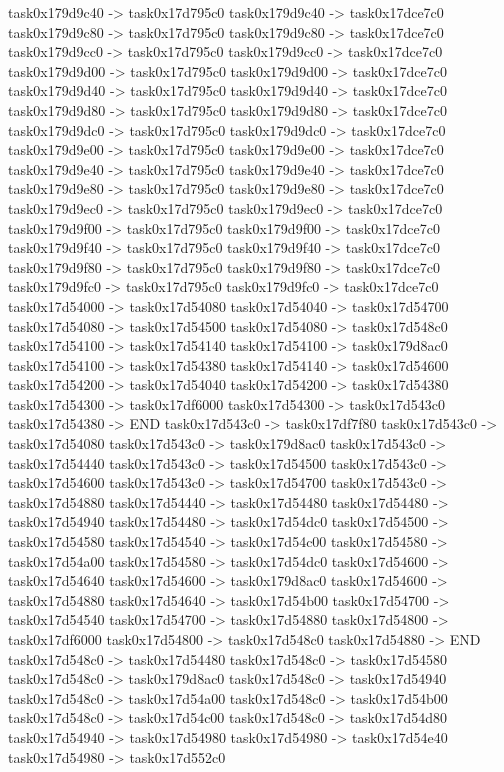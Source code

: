 {	task0x179d9c40 -> task0x17d795c0
	task0x179d9c40 -> task0x17dce7c0
	task0x179d9c80 -> task0x17d795c0
	task0x179d9c80 -> task0x17dce7c0
	task0x179d9cc0 -> task0x17d795c0
	task0x179d9cc0 -> task0x17dce7c0
	task0x179d9d00 -> task0x17d795c0
	task0x179d9d00 -> task0x17dce7c0
	task0x179d9d40 -> task0x17d795c0
	task0x179d9d40 -> task0x17dce7c0
	task0x179d9d80 -> task0x17d795c0
	task0x179d9d80 -> task0x17dce7c0
	task0x179d9dc0 -> task0x17d795c0
	task0x179d9dc0 -> task0x17dce7c0
	task0x179d9e00 -> task0x17d795c0
	task0x179d9e00 -> task0x17dce7c0
	task0x179d9e40 -> task0x17d795c0
	task0x179d9e40 -> task0x17dce7c0
	task0x179d9e80 -> task0x17d795c0
	task0x179d9e80 -> task0x17dce7c0
	task0x179d9ec0 -> task0x17d795c0
	task0x179d9ec0 -> task0x17dce7c0
	task0x179d9f00 -> task0x17d795c0
	task0x179d9f00 -> task0x17dce7c0
	task0x179d9f40 -> task0x17d795c0
	task0x179d9f40 -> task0x17dce7c0
	task0x179d9f80 -> task0x17d795c0
	task0x179d9f80 -> task0x17dce7c0
	task0x179d9fc0 -> task0x17d795c0
	task0x179d9fc0 -> task0x17dce7c0
	task0x17d54000 -> task0x17d54080
	task0x17d54040 -> task0x17d54700
	task0x17d54080 -> task0x17d54500
	task0x17d54080 -> task0x17d548c0
	task0x17d54100 -> task0x17d54140
	task0x17d54100 -> task0x179d8ac0
	task0x17d54100 -> task0x17d54380
	task0x17d54140 -> task0x17d54600
	task0x17d54200 -> task0x17d54040
	task0x17d54200 -> task0x17d54380
	task0x17d54300 -> task0x17df6000
	task0x17d54300 -> task0x17d543c0
	task0x17d54380 -> END
	task0x17d543c0 -> task0x17df7f80
	task0x17d543c0 -> task0x17d54080
	task0x17d543c0 -> task0x179d8ac0
	task0x17d543c0 -> task0x17d54440
	task0x17d543c0 -> task0x17d54500
	task0x17d543c0 -> task0x17d54600
	task0x17d543c0 -> task0x17d54700
	task0x17d543c0 -> task0x17d54880
	task0x17d54440 -> task0x17d54480
	task0x17d54480 -> task0x17d54940
	task0x17d54480 -> task0x17d54dc0
	task0x17d54500 -> task0x17d54580
	task0x17d54540 -> task0x17d54c00
	task0x17d54580 -> task0x17d54a00
	task0x17d54580 -> task0x17d54dc0
	task0x17d54600 -> task0x17d54640
	task0x17d54600 -> task0x179d8ac0
	task0x17d54600 -> task0x17d54880
	task0x17d54640 -> task0x17d54b00
	task0x17d54700 -> task0x17d54540
	task0x17d54700 -> task0x17d54880
	task0x17d54800 -> task0x17df6000
	task0x17d54800 -> task0x17d548c0
	task0x17d54880 -> END
	task0x17d548c0 -> task0x17d54480
	task0x17d548c0 -> task0x17d54580
	task0x17d548c0 -> task0x179d8ac0
	task0x17d548c0 -> task0x17d54940
	task0x17d548c0 -> task0x17d54a00
	task0x17d548c0 -> task0x17d54b00
	task0x17d548c0 -> task0x17d54c00
	task0x17d548c0 -> task0x17d54d80
	task0x17d54940 -> task0x17d54980
	task0x17d54980 -> task0x17d54e40
	task0x17d54980 -> task0x17d552c0
}
